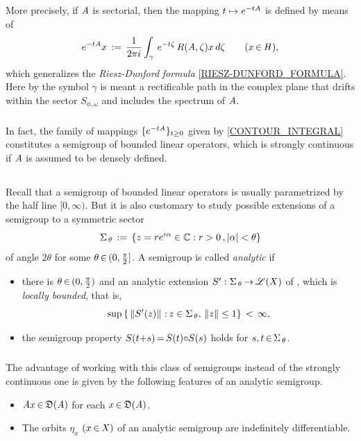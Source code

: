 \documentclass[11pt,twoside]{article}
\begin{document}
\subparagraph{}
More precisely,
if $\mathit{A}$ is sectorial,
then the mapping $t \mapsto e^{-t \mathit{A}}$ is defined
by means of %
\begin{equation}\label{CONTOUR_INTEGRAL}
e^{-t \mathit{A}} x \,:=\,
\frac{1}{2 \pi i}
\int_{\gamma} \, e^{-t \zeta} \, R(\mathit{A},\zeta)x \, d\zeta
\quad \quad (x {\,\in\,} \mathit{H}),
\end{equation}
which generalizes the \textit{Riesz-Dunford} \textit{formula}
\eqref{RIESZ-DUNFORD_FORMULA}.
Here by the symbol $\gamma$ is meant a rectificable path in the complex plane
that drifts within the sector $S_{\phi,\omega}$
and includes the spectrum of $\mathit{A}$.

\subparagraph{}
In fact,
the family of mappings $\{e^{-t \mathit{A}} \}_{t \geq 0}$
given by \eqref{CONTOUR_INTEGRAL}
constitutes a semigroup of bounded linear operators,
which is strongly continuous
if $\mathit{A}$ is assumed to be densely defined.

\subsection{} %
Recall that a semigroup of bounded linear operators is usually parametrized
by the half line $[0,\infty)$.
But it is also customary to study possible extensions of a semigroup to a
symmetric sector
\[
\Sigma_{\,\theta} \eqdef
\{z=re^{i\alpha} \in \C: r > 0\,, \abs{\alpha} < \theta\}
\]
of angle $2 \theta$ for some $\theta {\,\in\,} (0,\frac{\pi}{2}]$.
A semigroup {\SG} is called \textit{analytic} if

\begin{itemize}[leftmargin=12pt]
\item[1.]
there is $\theta {\,\in\,} (0,\frac{\pi}{2})$
and an analytic extension ${S}':\Sigma_{\,\theta} {\,\to\,} \mathscr{L}(X)$ of {\SG},
which is \textit{locally bounded},
that is,
\[
\sup \,
\{ \, \left\lVert {S}'(z) \right\rVert {\,:\,} z \in \Sigma_{\,\theta}, \, \left\lVert z \right\rVert \leq 1 \}
\, < \, \infty,
\]
\item[2.]
the semigroup property $S(t{+}s) {\,=\,} S(t) {\circ} S(s)$ holds
for $s,t {\,\in\,} \Sigma_{\,\theta}$.
\end{itemize}

\subparagraph{} %
The advantage of working with this class of semigroups
instead of the strongly continuous one is given by the following features
of an analytic semigroup.

\begin{itemize}[leftmargin=4mm]
\item[1.]
$\mathit{A} x {\,\in\,} \mathfrak{D}(\mathit{A})$ for each $x {\,\in\,} \mathfrak{D}(\mathit{A})$.

\item[2.]
The orbits $\eta_x$ $(x {\,\in\,} \mathit{X})$ of an analytic semigroup
are indefinitely differentiable.
\end{itemize}
\end{document}
